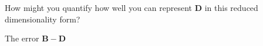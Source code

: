 How might you quantify how well you can represent $\boldsymbol{D}$ in this reduced dimensionality form?

\begin{solution}
    The error $\boldsymbol{B} - \boldsymbol{D}$
\end{solution}